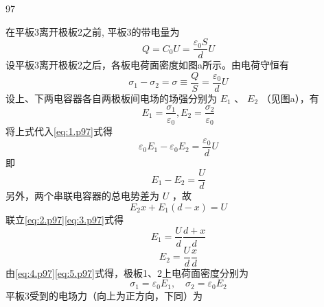 \begin{solution}{97}
    \begin{subsolution}
        在平板3离开极板2之前, 平板3的带电量为
        \begin{equation*}
            Q = C _ {0} U = \frac {\varepsilon_ {0} S}{d} U
        \end{equation*}
        设平板3离开极板2之后，各板电荷面密度如图a所示。由电荷守恒有
        \begin{equation}
            \sigma_ {1} - \sigma_ {2} = \sigma \equiv \frac {Q}{S} = \frac {\varepsilon_ {0}}{d} U
            \label{eq:1.p97}
        \end{equation}
        设上、下两电容器各自两极板间电场的场强分别为 $E_{1}$ 、 $E_{2}$ （见图a），有
        \begin{equation*}
            E _ {1} = \frac {\sigma_ {1}}{\varepsilon_ {0}}, E _ {2} = \frac {\sigma_ {2}}{\varepsilon_ {0}}
        \end{equation*}
        将上式代入\eqref{eq:1.p97}式得
        \begin{equation*}
            \varepsilon_ {0} E _ {1} - \varepsilon_ {0} E _ {2} = \frac {\varepsilon_ {0}}{d} U
        \end{equation*}
        即
        \begin{equation}
            E _ {1} - E _ {2} = \frac {U}{d}
            \label{eq:2.p97}
        \end{equation}
        另外，两个串联电容器的总电势差为 $U$ ，故
        \begin{equation}
            E _ {2} x + E _ {1} (d - x) = U
            \label{eq:3.p97}
        \end{equation}
        联立\eqref{eq:2.p97}\eqref{eq:3.p97}式得
        \begin{equation}
            E _ {1} = \frac {U}{d} \frac {d + x}{d}
            \label{eq:4.p97}
        \end{equation}
        \begin{equation}
            E _ {2} = \frac {U}{d} \frac {x}{d}
            \label{eq:5.p97}
        \end{equation}
        由\eqref{eq:4.p97}\eqref{eq:5.p97}式得，极板1、2上电荷面密度分别为
        \begin{equation*}
            \sigma_ {1} = \varepsilon_ {0} E _ {1}, \quad \sigma_ {2} = \varepsilon_ {0} E _ {2}
        \end{equation*}
        平板3受到的电场力（向上为正方向，下同）为
        \begin{equation}

\end{equation}
\end{subsolution}
\end{solution}
